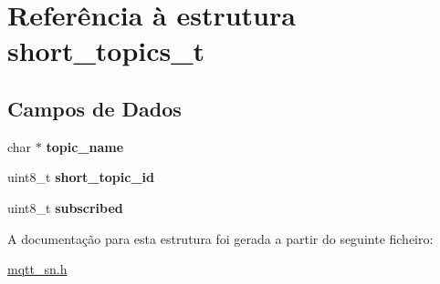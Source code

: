 \hypertarget{structshort__topics__t}{\section{Referência à estrutura short\+\_\+topics\+\_\+t}
\label{structshort__topics__t}
}
\subsection*{Campos de Dados}
\begin{DoxyCompactItemize}
\item 
\hypertarget{structshort__topics__t_a0f942951500293608a04b92a49df4f69}{char $\ast$ {\bfseries topic\+\_\+name}}\label{structshort__topics__t_a0f942951500293608a04b92a49df4f69}

\item 
\hypertarget{structshort__topics__t_aa0a77b0dbcddeb15cfc004d18a9a093a}{uint8\+\_\+t {\bfseries short\+\_\+topic\+\_\+id}}\label{structshort__topics__t_aa0a77b0dbcddeb15cfc004d18a9a093a}

\item 
\hypertarget{structshort__topics__t_aa508bc242f4e53ea59cf936e8072aa2d}{uint8\+\_\+t {\bfseries subscribed}}\label{structshort__topics__t_aa508bc242f4e53ea59cf936e8072aa2d}

\end{DoxyCompactItemize}


A documentação para esta estrutura foi gerada a partir do seguinte ficheiro\+:\begin{DoxyCompactItemize}
\item 
\hyperlink{mqtt__sn_8h}{mqtt\+\_\+sn.\+h}\end{DoxyCompactItemize}
